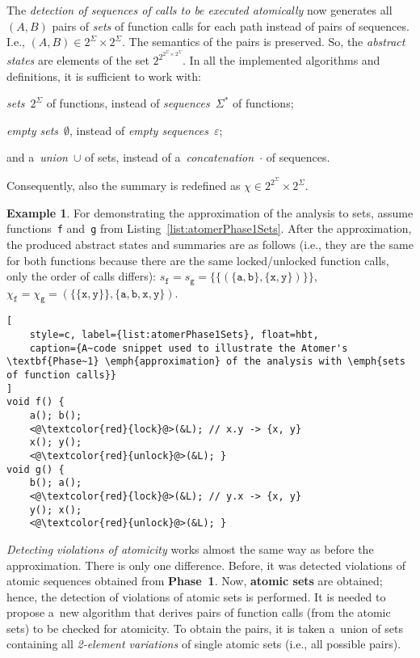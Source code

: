 \documentclass{ExcelAtFIT}
\theoremstyle{definition}
\newtheorem{example}{Example}[section]
\begin{document}
The \emph{detection of sequences of calls to be executed atomically} now generates all ${ (A, B) }$ pairs of \emph{sets} of function calls for each path instead of pairs of sequences. I.e., $ {(A, B)} \in 2^\Sigma \times 2^\Sigma $. The semantics of the pairs is preserved. So, the \emph{abstract states} are elements of the set $ 2^{2^{2^\Sigma \times 2^\Sigma}} $. In all the implemented algorithms and definitions, it is sufficient to work with:
\begin{enuminline}
    \item \emph{sets}~$ 2^\Sigma $ of functions, instead of \emph{sequences}~$ \Sigma^* $ of functions;

    \item \emph{empty sets}~$ \emptyset $, instead of \emph{empty sequences}~$ \varepsilon $;
    
    \item and a~\emph{union}~$ \cup $ of sets, instead of a~\emph{concatenation}~$ \cdot $ of sequences.
\end{enuminline}
Consequently, also the summary is redefined as $ \chi \in 2^{2^\Sigma} \times 2^\Sigma $.

\begin{example}
    For demonstrating the approximation of the analysis to sets, assume functions~\texttt{f} and~\texttt{g} from Listing~\ref{list:atomerPhase1Sets}. After the approximation, the produced abstract states and summaries are as follows (i.e., they are the same for both functions because there are the same locked/unlocked function calls, only the order of calls differs): $ s_\mathtt{f} = s_\mathtt{g} = \{\{({\{\mathtt{a}, \mathtt{b}\}}, {\{\mathtt{x}, \mathtt{y}\}})\}\} $, $ \chi_\mathtt{f} = \chi_\mathtt{g} = ({\{\{\mathtt{x}, \mathtt{y}\}\}}, {\{\mathtt{a}, \mathtt{b}, \mathtt{x}, \mathtt{y}\}}) $.
\end{example}

\begin{lstlisting}[
    style=c, label={list:atomerPhase1Sets}, float=hbt,
    caption={A~code snippet used to illustrate the Atomer's \textbf{Phase~1} \emph{approximation} of the analysis with \emph{sets of function calls}}
]
void f() {
    a(); b();
    <@\textcolor{red}{lock}@>(&L); // x.y -> {x, y}
    x(); y();
    <@\textcolor{red}{unlock}@>(&L); }
void g() {
    b(); a();
    <@\textcolor{red}{lock}@>(&L); // y.x -> {x, y}
    y(); x();
    <@\textcolor{red}{unlock}@>(&L); }
\end{lstlisting}

\emph{Detecting violations of atomicity} works almost the same way as before the approximation. There is only one difference. Before, it was detected violations of atomic sequences obtained from \textbf{Phase~1}. Now, \textbf{atomic sets} are obtained; hence, the detection of violations of atomic sets is performed. It is needed to propose a~new algorithm that derives pairs of function calls (from the atomic sets) to be checked for atomicity. To obtain the pairs, it is taken a~union of sets containing all \emph{2-element variations} of single atomic sets (i.e., all possible pairs).
\end{document}
